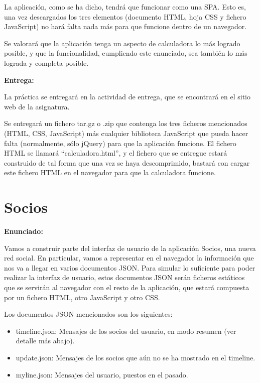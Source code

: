 La aplicación, como se ha dicho, tendrá que funcionar como una SPA. Esto es, una vez descargados los tres elementos (documento HTML, hoja CSS y fichero JavaScript) no hará falta nada más para que funcione dentro de un navegador.

Se valorará que la aplicación tenga un aspecto de calculadora lo más logrado posible, y que la funcionalidad, cumpliendo este enunciado, sea también lo más lograda y completa posible.

\textbf{Entrega:}

La práctica se entregará en la actividad de entrega, que se encontrará en el sitio web de la asignatura.

Se entregará un fichero tar.gz o .zip que contenga los tres ficheros mencionados (HTML, CSS, JavaScript) más cualquier biblioteca JavaScript que pueda hacer falta (normalmente, sólo jQuery) para que la aplicación funcione. El fichero HTML se llamará ``calculadora.html'', y el fichero que se entregue estará construido de tal forma que una vez se haya descomprimido, bastará con cargar este fichero HTML en el navegador para que la calculadora funcione.

\section{Socios}
\label{sec:voluntaria-socios}

\textbf{Enunciado:}

Vamos a construir parte del interfaz de usuario de la aplicación Socios, una nueva red social. En particular, vamos a representar en el navegador la información que nos va a llegar en varios documentos JSON. Para simular lo suficiente para poder realizar la interfaz de usuario, estos documentos JSON serán ficheros estáticos que se servirán al navegador con el resto de la aplicación, que estará compuesta por un fichero HTML, otro JavaScript y otro CSS.

Los documentos JSON mencionados son los siguientes:

\begin{itemize}
\item timeline.json: Mensajes de los socios del usuario, en modo resumen (ver detalle más abajo).
\item update.json: Mensajes de los socios que aún no se ha mostrado en el timeline.
\item myline.json: Mensajes del usuario, puestos en el pasado.
\end{itemize}

